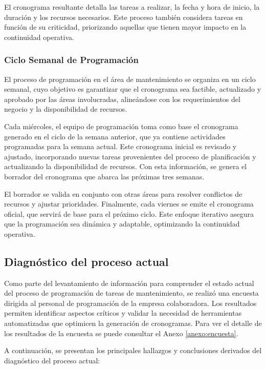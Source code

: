 \documentclass{article}
\begin{document}
El cronograma resultante detalla las tareas a realizar, la fecha y hora de inicio, la duración y los recursos necesarios. Este proceso también considera tareas en función de su criticidad, priorizando aquellas que tienen mayor impacto en la continuidad operativa.

\subsubsection{Ciclo Semanal de Programación}

El proceso de programación en el área de mantenimiento se organiza en un ciclo semanal, cuyo objetivo es garantizar que el cronograma sea factible, actualizado y aprobado por las áreas involucradas, alineándose con los requerimientos del negocio y la disponibilidad de recursos.

Cada miércoles, el equipo de programación toma como base el cronograma generado en el ciclo de la semana anterior, que ya contiene actividades programadas para la semana actual. Este cronograma inicial es revisado y ajustado, incorporando nuevas tareas provenientes del proceso de planificación y actualizando la disponibilidad de recursos. Con esta información, se genera el borrador del cronograma que abarca las próximas tres semanas.

El borrador se valida en conjunto con otras áreas para resolver conflictos de recursos y ajustar prioridades. Finalmente, cada viernes se emite el cronograma oficial, que servirá de base para el próximo ciclo. Este enfoque iterativo asegura que la programación sea dinámica y adaptable, optimizando la continuidad operativa.


\subsection{Diagnóstico del proceso actual}

Como parte del levantamiento de información para comprender el estado actual del proceso de programación de tareas de mantenimiento, se realizó una encuesta dirigida al personal de programación de la empresa colaboradora. Los resultados permiten identificar aspectos críticos y validar la necesidad de herramientas automatizadas que optimicen la generación de cronogramas. Para ver el detalle de los resultados de la encuesta se puede consultar el Anexo \ref{anexo:encuesta}.

A continuación, se presentan los principales hallazgos y conclusiones derivados del diagnóstico del proceso actual:
\end{document}
